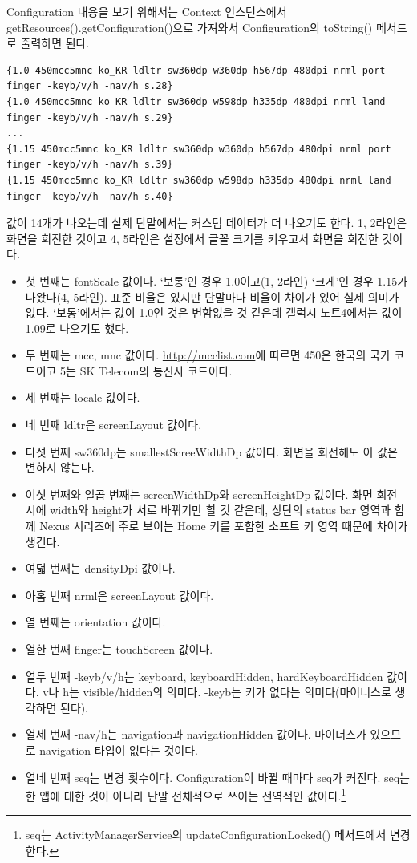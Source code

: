 Configuration 내용을 보기 위해서는 Context 인스턴스에서 getResources().getConfigura\-tion()으로 가져와서 Configuration의 toString() 메서드로 출력하면 된다. 
\begin{lstlisting}[frame=single]
{1.0 450mcc5mnc ko_KR ldltr sw360dp w360dp h567dp 480dpi nrml port finger -keyb/v/h -nav/h s.28}
{1.0 450mcc5mnc ko_KR ldltr sw360dp w598dp h335dp 480dpi nrml land finger -keyb/v/h -nav/h s.29}
...
{1.15 450mcc5mnc ko_KR ldltr sw360dp w360dp h567dp 480dpi nrml port finger -keyb/v/h -nav/h s.39}
{1.15 450mcc5mnc ko_KR ldltr sw360dp w598dp h335dp 480dpi nrml land finger -keyb/v/h -nav/h s.40}
\end{lstlisting}
값이 14개가 나오는데 실제 단말에서는 커스텀 데이터가 더 나오기도 한다. 1, 2라인은 화면을 회전한 것이고 4, 5라인은 설정에서 글꼴 크기를 키우고서 화면을 회전한 것이다.
\begin{itemize}
\item 첫 번째는 fontScale 값이다. `보통'인 경우 1.0이고(1, 2라인) `크게'인 경우 1.15가 나왔다(4, 5라인). 표준 비율은 있지만 단말마다 비율이 차이가 있어 실제 의미가 없다. `보통'에서는 값이 1.0인 것은 변함없을 것 같은데 갤럭시 노트4에서는 값이 1.09로 나오기도 했다.
\item 두 번째는 mcc, mnc 값이다. \url{http://mcclist.com}에 따르면 450은 한국의 국가 코드이고 5는 SK Telecom의 통신사 코드이다.
\item 세 번째는 locale 값이다.
\item 네 번째 ldltr은 screenLayout 값이다.
\item 다섯 번째 sw360dp는 smallestScreeWidthDp 값이다. 화면을 회전해도 이 값은 변하지 않는다.
\item 여섯 번째와 일곱 번째는 screenWidthDp와 screenHeightDp 값이다. 화면 회전 시에 width와 height가 서로 바뀌기만 할 것 같은데, 상단의 status bar 영역과 함께 Nexus 시리즈에 주로 보이는 Home 키를 포함한 소프트 키 영역 때문에 차이가 생긴다.
\item 여덟 번째는 densityDpi 값이다.
\item 아홉 번째 nrml은 screenLayout 값이다.
\item 열 번째는 orientation 값이다.
\item 열한 번째 finger는 touchScreen 값이다.
\item 열두 번째 -keyb/v/h는 keyboard, keyboardHidden, hardKeyboardHidden 값이다. v나 h는 visible/hidden의 의미다. -keyb는 키가 없다는 의미다(마이너스로 생각하면 된다).
\item 열세 번째 -nav/h는 navigation과 navigationHidden 값이다. 마이너스가 있으므로 navigation 타입이 없다는 것이다. 
\item 열네 번째 seq는 변경 횟수이다. Configuration이 바뀔 때마다 seq가 커진다. seq는 한 앱에 대한 것이 아니라 단말 전체적으로 쓰이는 전역적인 값이다.\footnote{seq는 ActivityManagerService의 updateConfigurationLocked() 메서드에서 변경한다.}
\end{itemize}

